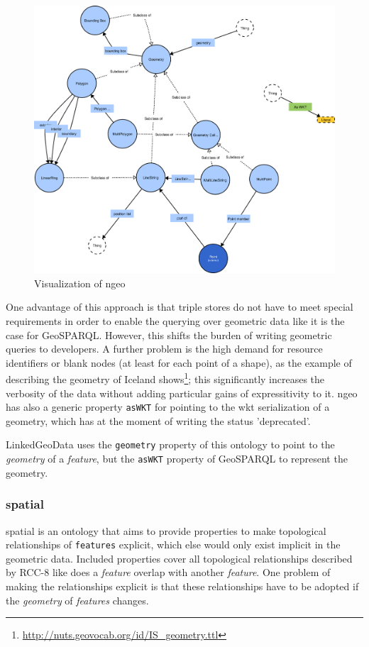 \documentclass[draft,final]{vutinfth} %
\begin{document}
\begin{figure}[h]
    \centering
    \includegraphics[width=1.0\textwidth]{graphics/vocabularies/geom.png}
    \caption{Visualization of \gls{ngeo}}
    \label{fig:related-work-geospatial-ontologies:ngeo}
\end{figure}

One advantage of this approach is that triple stores do not have to meet special requirements in order to enable the querying over geometric data like it is the case for GeoSPARQL. However, this shifts the burden of writing geometric queries to developers. A further problem is the high demand for resource identifiers or blank nodes (at least for each point of a shape), as the example of describing the geometry of Iceland shows\footnote{\url{http://nuts.geovocab.org/id/IS_geometry.ttl}}; this significantly increases the verbosity of the data without adding particular gains of expressitivity to it\cite{battle_geosparql:_2011}. \gls{ngeo} has also a generic property \texttt{asWKT} for pointing to the \gls{wkt} serialization of a geometry, which has at the moment of writing the status 'deprecated'.

LinkedGeoData uses the \texttt{geometry} property of this ontology to point to the \textit{geometry} of a \textit{feature}, but the \texttt{asWKT} property of GeoSPARQL to represent the geometry.

\subsubsection{\gls{spatial}}
\gls{spatial} is an ontology that aims to provide properties to make topological relationships of \texttt{features} explicit, which else would only exist implicit in the geometric data. Included properties cover all topological relationships described by RCC-8 like does a \textit{feature} overlap with another \textit{feature}. One problem of making the relationships explicit is that these relationships have to be adopted if the \textit{geometry} of \textit{features} changes.
\end{document}
